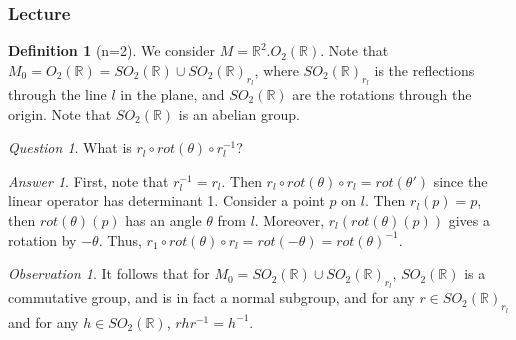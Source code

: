 \documentclass[12pt]{article}
\theoremstyle{definition}
\newtheorem{defn}[thm]{Definition}
\theoremstyle{remark}
\newtheorem*{qst}{Question}
\newtheorem*{ans}{Answer}
\newtheorem{obs}[thm]{Observation}
\numberwithin{equation}{section}
\newcommand\R{\mathbb R}    %
\begin{document}
\subsubsection{Lecture}

\begin{defn}[n=2]
        We consider $M = \R^2.O_2(\R)$. Note that $M_0 = O_2(\R) = SO_2(\R)\cup SO_2(\R)_{r_l}$, where $SO_2(\R)_{r_l}$ is the reflections through the line $l$ in the plane, and $SO_2(\R)$ are the rotations through the origin. Note that $SO_2(\R)$ is an abelian group.
\end{defn}

\vspace{15pt}

\begin{qst}
        What is $r_l\circ rot(\theta)\circ r_l^{-1}$?
\end{qst}
\begin{ans}
        First, note that $r_l^{-1} = r_l$. Then $r_l\circ rot(\theta) \circ r_l = rot(\theta')$ since the linear operator has determinant 1. Consider a point $p$ on $l$. Then $r_l(p) = p$, then $rot(\theta)(p)$ has an angle $\theta$ from $l$. Moreover, $r_l(rot(\theta)(p))$ gives a rotation by $-\theta$. Thus, $r_1\circ rot(\theta) \circ r_l = rot(-\theta) = rot(\theta)^{-1}$.
\end{ans}

\vspace{15pt}

\begin{obs}
        It follows that for $M_0 = SO_2(\R)\cup SO_2(\R)_{r_l}$, $SO_2(\R)$ is a commutative group, and is in fact a normal subgroup, and for any $r \in SO_2(\R)_{r_l}$ and for any $h \in SO_2(\R)$, $rhr^{-1} = h^{-1}$.
\end{obs}

\vspace{15pt}
\end{document}
